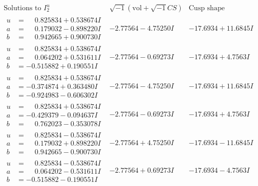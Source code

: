 \documentclass[1p]{elsarticle_modified}
\theoremstyle{definition}
\newcommand{\I}{\sqrt{-1}}
\begin{document}
$$\begin{array}{c|c|c}  
\text{Solutions to }I^u_{2}& \I (\text{vol} + \sqrt{-1}CS) & \text{Cusp shape}\\
 \hline 
\begin{aligned}
u &= \phantom{-}0.825834 + 0.538674 I \\
a &= \phantom{-}0.179032 - 0.898220 I \\
b &= \phantom{-}0.942665 + 0.900730 I\end{aligned}
 & -2.77564 - 4.75250 I & -17.6934 + 11.6845 I \\ \hline\begin{aligned}
u &= \phantom{-}0.825834 + 0.538674 I \\
a &= \phantom{-}0.064202 + 0.531611 I \\
b &= -0.515882 + 0.190551 I\end{aligned}
 & -2.77564 - 0.69273 I & -17.6934 + 4.7563 I \\ \hline\begin{aligned}
u &= \phantom{-}0.825834 + 0.538674 I \\
a &= -0.374874 + 0.363480 I \\
b &= -0.924983 - 0.606302 I\end{aligned}
 & -2.77564 - 4.75250 I & -17.6934 + 11.6845 I \\ \hline\begin{aligned}
u &= \phantom{-}0.825834 + 0.538674 I \\
a &= -0.429379 - 0.094637 I \\
b &= \phantom{-}0.762023 - 0.353078 I\end{aligned}
 & -2.77564 - 0.69273 I & -17.6934 + 4.7563 I \\ \hline\begin{aligned}
u &= \phantom{-}0.825834 - 0.538674 I \\
a &= \phantom{-}0.179032 + 0.898220 I \\
b &= \phantom{-}0.942665 - 0.900730 I\end{aligned}
 & -2.77564 + 4.75250 I & -17.6934 - 11.6845 I \\ \hline\begin{aligned}
u &= \phantom{-}0.825834 - 0.538674 I \\
a &= \phantom{-}0.064202 - 0.531611 I \\
b &= -0.515882 - 0.190551 I\end{aligned}
 & -2.77564 + 0.69273 I & -17.6934 - 4.7563 I \\ \hline\begin{aligned}

\end{aligned}
\end{array}$$
\end{document}

